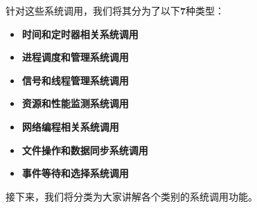 针对这些系统调用，我们将其分为了以下\textbf{7}种类型：

\begin{itemize}
    \item \textbf{时间和定时器相关系统调用}

    \item \textbf{进程调度和管理系统调用}

    \item \textbf{信号和线程管理系统调用}

    \item \textbf{资源和性能监测系统调用}

    \item \textbf{网络编程相关系统调用}

    \item \textbf{文件操作和数据同步系统调用}

    \item \textbf{事件等待和选择系统调用}
\end{itemize}

接下来，我们将分类为大家讲解各个类别的系统调用功能。

